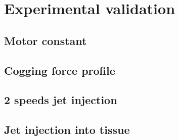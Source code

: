 \section{Experimental validation}                   \label{Chapter:experiment/experimental validation}
    \subsection{Motor constant}                     \label{Chapter:experiment/experimental validation/motor constant}
    \subsection{Cogging force profile}              \label{Chapter:experiment/experimental validation/cogging force}
    \subsection{2 speeds jet injection}             \label{Chapter:experiment/experimental validation/2 speed jet injection}
    \subsection{Jet injection into tissue}          \label{Chapter:experiment/experimental validation/jet injection into tissue}
    